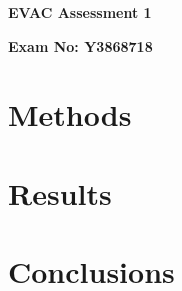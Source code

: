 \documentclass[12pt]{article}
\begin{document}
\begin{titlepage}
\begin{center}
\vspace*{1cm}
\Huge
\textbf{EVAC Assessment 1}
\vspace{1.5cm}
\Large

\textbf{Exam No: Y3868718}
\vfill
\end{center}
\end{titlepage}
\section{Methods}

\pagebreak
\section{Results}

\pagebreak
\section{Conclusions}

\pagebreak
\printbibliography
\end{document}

